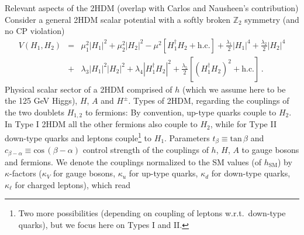\documentclass[../report.tex]{subfiles}
\begin{document}
Relevant aspects of the 2HDM (overlap with Carlos and Nausheen's contribution) Consider a general 2HDM scalar potential 
with a softly broken $\mathbb{Z}_2$ symmetry (and no CP violation)  
%
\begin{eqnarray}	
\label{2HDM_potential}
V(H_1,H_2) &= &\mu^2_1 \left|H_1\right|^2 + \mu^2_2\left|H_2\right|^2 - \mu^2\left[H_1^{\dagger}H_2+\mathrm{h.c.}\right] 
+\frac{\lambda_1}{2}\left|H_1\right|^4 +\frac{\lambda_2}{2}\left|H_2\right|^4 \nonumber \\
&+& \lambda_3 \left|H_1\right|^2\left|H_2\right|^2
+\lambda_4 \left|H_1^{\dagger}H_2\right|^2+ \frac{\lambda_5}{2}\left[\left(H_1^{\dagger}H_2\right)^2+\mathrm{h.c.}\right]\, . 
\end{eqnarray}
%
Physical scalar sector of a 2HDM comprised of $h$ (which we assume here to be the 125 GeV Higgs), $H$, $A$ and $H^{\pm}$. 
Types of 2HDM, regarding the couplings of the two doublets $H_{1,2}$ to fermions: By convention, up-type quarks couple to $H_{2}$. In Type I 2HDM all the other fermions also couple to $H_{2}$, while for Type II down-type quarks and leptons couple\footnote{Two more possibilities (depending on coupling of leptons w.r.t.~down-type quarks), but we focus here on Types I and II.} to $H_{1}$.
Parameters $t_{\beta} \equiv \mathrm{tan}\,\beta$ and $c_{\beta -\alpha} \equiv \mathrm{cos}\,(\beta-\alpha)$ control strength of the couplings 
of $h$, $H$, $A$ to gauge bosons and fermions. We denote the couplings normalized to the SM values (of $h_{\mathrm{SM}}$) by $\kappa$-factors ($\kappa_V$ for gauge bosons, $\kappa_u$ for up-type quarks, $\kappa_d$ for 
down-type quarks, $\kappa_{\ell}$ for charged leptons), which read 
%
\end{document}
